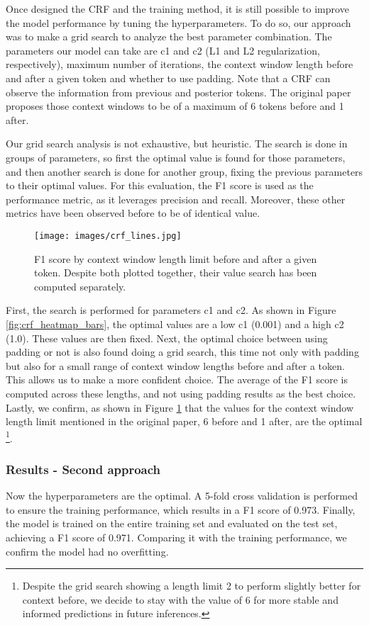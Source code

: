 \documentclass{article}
\begin{document}
Once designed the CRF and the training method, it is still possible to improve the model performance
by tuning the hyperparameters. To do so, our approach
was to make a grid search to analyze the best parameter combination. The parameters our model can take
are c1 and c2 (L1 and L2 regularization, respectively), maximum number of iterations, the context window
length before and after a given token and whether to use padding. Note that a CRF can observe the information
from previous and posterior tokens. The original paper proposes those context windows to be of a maximum of 6
tokens before and 1 after.

Our grid search analysis is not exhaustive, but heuristic. The search is done in groups of parameters, so
first the optimal value is found for those parameters, and then another search is done for another group,
fixing the previous parameters to their optimal values. For this evaluation, the F1 score is used as the
performance metric, as it leverages precision and recall. Moreover, these other metrics have been observed
before to be of identical value.

\begin{figure}[!t]
	\centering
	\texttt{[image: images/crf\_lines.jpg]}
	\captionsetup{width=0.9\textwidth}
	\caption{F1 score by context window length limit before and after a given token. Despite both plotted
	together, their value search has been computed separately.}
	\label{fig:crf_lines}
\end{figure}

First, the search is performed for parameters c1 and c2. As shown in Figure \ref{fig:crf_heatmap_bars},
the optimal values are a
low c1 (0.001) and a high c2 (1.0). These values are then fixed. Next, the optimal choice between using
padding or not is also found doing a grid search, this time not only with padding but also for a small
range of context window lengths before and after a token. This allows us to make a more confident choice.
The average of the F1 score is computed across these lengths, and not using padding results as the best
choice. Lastly, we confirm, as shown in Figure \ref{fig:crf_lines} that the values for the context
window length limit mentioned in the original
paper, 6 before and 1 after, are the optimal \footnote{Despite the grid search showing a length limit 2
to perform slightly better for context before, we decide to stay with the value of 6 for more stable and
informed predictions in future inferences.}.

\subsubsection*{Results - Second approach}
Now the hyperparameters are the optimal. A 5-fold cross validation is performed to ensure the training
performance, which results in a F1 score of 0.973. Finally, the model is trained on the entire training
set and evaluated on the test set, achieving a F1 score of 0.971. Comparing it with the training performance,
we confirm the model had no overfitting.
\end{document}

